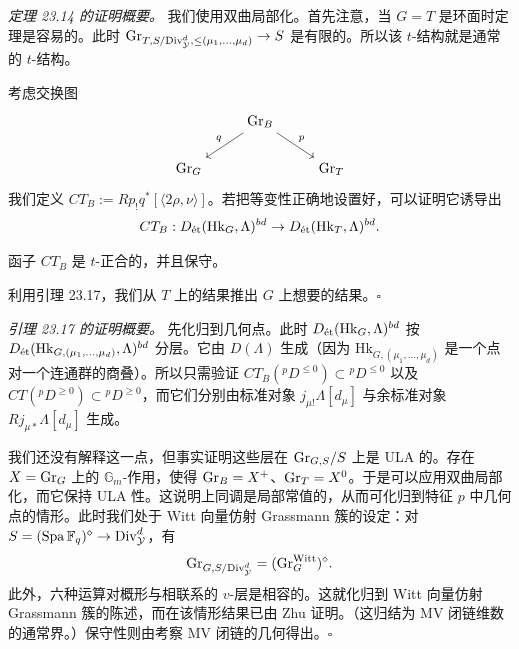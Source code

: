 \emph{定理 23.14 的证明概要。} 我们使用双曲局部化。首先注意，当 $G=T$ 是环面时定理是容易的。此时 $\Gr_{T,S/\Div^d_{\cY},\le(\mu_1,\ldots,\mu_d)}\to S$ 是有限的。所以该 $t$-结构就是通常的 $t$-结构。

考虑交换图
\[
\begin{tikzcd}
& \Gr_B \arrow[dl,"q"'] \arrow[dr,"p"] \\
\Gr_G && \Gr_T
\end{tikzcd}
\]
我们定义 $CT_B:=Rp_!q^*[\langle2\rho,\nu\rangle]$。若把等变性正确地设置好，可以证明它诱导出
\[
CT_B:D_{\et}(\mathrm{Hk}_G,\Lambda)^{bd}\to D_{\et}(\mathrm{Hk}_T,\Lambda)^{bd}.
\]

\begin{lemma}[关键引理]
函子 $CT_B$ 是 $t$-正合的，并且保守。
\end{lemma}

利用引理 23.17，我们从 $T$ 上的结果推出 $G$ 上想要的结果。\hfill$\square$

\emph{引理 23.17 的证明概要。} 先化归到几何点。此时 $D_{\et}(\mathrm{Hk}_G,\Lambda)^{bd}$ 按 $D_{\et}(\mathrm{Hk}_{G,(\mu_1,\ldots,\mu_d)},\Lambda)^{bd}$ 分层。它由 $D(\Lambda)$ 生成（因为 $\mathrm{Hk}_{G,(\mu_1,\ldots,\mu_d)}$ 是一个点对一个连通群的商叠）。所以只需验证 $CT_B({}^pD^{\le0})\subset{}^pD^{\le0}$ 以及 $CT({}^pD^{\ge0})\subset{}^pD^{\ge0}$，而它们分别由标准对象 $j_{\mu!}\Lambda[d_\mu]$ 与余标准对象 $Rj_{\mu*}\Lambda[d_\mu]$ 生成。

我们还没有解释这一点，但事实证明这些层在 $\Gr_{G,S}/S$ 上是 ULA 的。存在 $X=\Gr_G$ 上的 $\mathbb{G}_m$-作用，使得 $\Gr_B=X^+$、$\Gr_T=X^0$。于是可以应用双曲局部化，而它保持 ULA 性。这说明上同调是局部常值的，从而可化归到特征 $p$ 中几何点的情形。此时我们处于 Witt 向量仿射 Grassmann 簇的设定：对 $S=(\Spa\Fq)^\diamond\to\Div^d_{\cY}$，有
\[
\Gr_{G,S/\Div^d_{\cY}}=(\Gr_G^{\mathrm{Witt}})^\diamond.
\]
此外，六种运算对概形与相联系的 $v$-层是相容的。这就化归到 Witt 向量仿射 Grassmann 簇的陈述，而在该情形结果已由 Zhu 证明。（这归结为 MV 闭链维数的通常界。）保守性则由考察 MV 闭链的几何得出。\hfill$\square$
